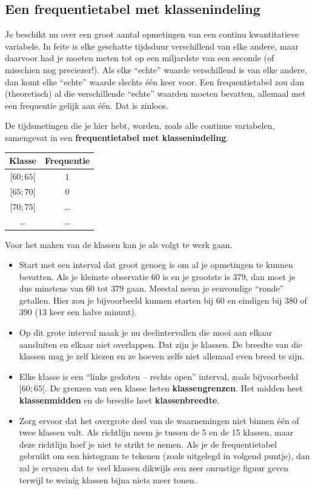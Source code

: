 \documentclass[12pt,twoside]{article}
\begin{document}
\subsection{Een frequentietabel met klassenindeling}

Je beschikt nu over een groot aantal opmetingen van een continu kwantitatieve variabele. In feite is
elke geschatte tijdsduur verschillend van elke andere, maar daarvoor had je moeten meten tot op een
miljardste van een seconde (of misschien nog preciezer!). Als elke “echte” waarde verschillend is
van elke andere, dan komt elke “echte” waarde slechts één keer voor. Een frequentietabel zou dan
(theoretisch) al die verschillende “echte” waarden moeten bevatten, allemaal met een frequentie
gelijk aan één. Dat is zinloos.

De tijdsmetingen die je hier hebt, worden, zoals alle continue variabelen, samengevat in een
{\bf frequentietabel met klassenindeling}.

\begin{center}
  \begin{tabular}{|c|c|}
    \hline
    Klasse & Frequentie\\
    \hline
    $[60;65[$ & $1$\\
    \hline
    $[65;70[$ & $0$\\
    \hline
    $[70;75[$ & \ldots\\
    \hline
    \ldots & \ldots\\
    \hline
  \end{tabular}
\end{center}

Voor het maken van de klassen kan je als volgt te werk gaan.
\begin{itemize}
  \item Start met een interval dat groot genoeg is om al je opmetingen te kunnen bevatten. Als je
kleinste observatie 60 is en je grootste is 379, dan moet je dus minstens van 60 tot 379 gaan.
Meestal neem je eenvoudige “ronde” getallen. Hier zou je bijvoorbeeld kunnen starten bij 60 en eindigen bij 380 of 390 (13 keer een halve minuut).
  \item Op dit grote interval maak je nu deelintervallen die mooi aan elkaar aansluiten en elkaar niet overlappen. Dat zijn je klassen. De breedte van die klassen mag je zelf kiezen en ze hoeven zelfs niet allemaal even breed te zijn.
  \item Elke klasse is een “links gesloten – rechts open” interval, zoals bijvoorbeeld $[60;65[$. De grenzen van een klasse heten {\bf klassengrenzen}. Het midden heet {\bf klassenmidden} en de breedte heet {\bf klassenbreedte}.
  \item Zorg ervoor dat het overgrote deel van de waarnemingen niet binnen één of twee klassen valt. Als richtlijn neem je tussen de 5 en de 15 klassen, maar deze richtlijn hoef je niet te strikt te nemen. Als je de frequentietabel gebruikt om een histogram te tekenen (zoals uitgelegd in volgend puntje), dan zal je ervaren dat te veel klassen dikwijls een zeer onrustige figuur geven terwijl te weinig klassen bijna niets meer tonen.
\end{itemize}
\end{document}

